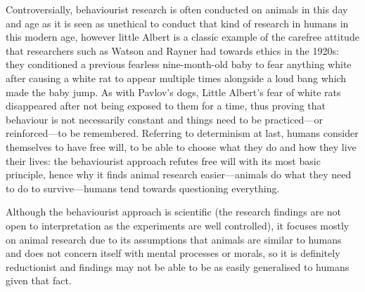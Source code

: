 \documentclass[a4paper]{article}
\begin{document}
\begin{enumerate}
{	Controversially, behaviourist research is often conducted on animals in this day and age as it is seen as unethical to conduct that kind of research in humans in this modern age, however little Albert is a classic example of the carefree attitude that researchers such as Watson and Rayner had towards ethics in the 1920s: they conditioned a previous fearless nine-month-old baby to fear anything white after causing a white rat to appear multiple times alongside a loud bang which made the baby jump.  As with Pavlov's dogs, Little Albert's fear of white rats disappeared after not being exposed to them for a time, thus proving that behaviour is not necessarily constant and things need to be practiced---or reinforced---to be remembered.  Referring to determinism at last, humans consider themselves to have free will, to be able to choose what they do and how they live their lives: the behaviourist approach refutes free will with its most basic principle, hence why it finds animal research easier---animals do what they need to do to survive---humans tend towards questioning everything.
	
	Although the behaviourist approach is scientific (the research findings are not open to interpretation as the experiments are well controlled), it focuses mostly on animal research due to its assumptions that animals are similar to humans and does not concern itself with mental processes or morals, so it is definitely reductionist and findings may not be able to be as easily generalised to humans given that fact.}
\end{enumerate} 
\end{document}
